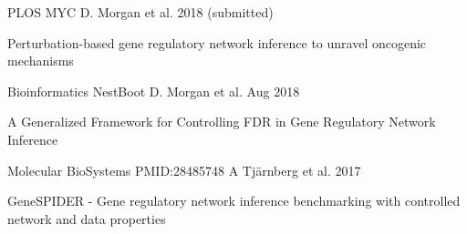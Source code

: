 \begin{cventries}
\cventry
    {PLOS}
    {MYC}
    {D. Morgan et al.}
    {2018 (submitted)}
    {
      \begin{cvitems}
        \item {Perturbation-based gene regulatory network inference to unravel oncogenic mechanisms}
      \end{cvitems}
    }
\cventry
    {Bioinformatics}
    {NestBoot}
    {D. Morgan et al.}
    {Aug 2018}
    {
      \begin{cvitems}
        \item {A Generalized Framework for Controlling FDR in Gene Regulatory Network Inference}
      \end{cvitems}
    }
  \cventry
    {Molecular BioSystems}
    {PMID:28485748 }
    {A Tjärnberg et al.}
    {2017}
    {
      \begin{cvitems}
        \item {GeneSPIDER - Gene regulatory network inference benchmarking with controlled network and data properties}
      \end{cvitems}
    }
\end{cventries}
